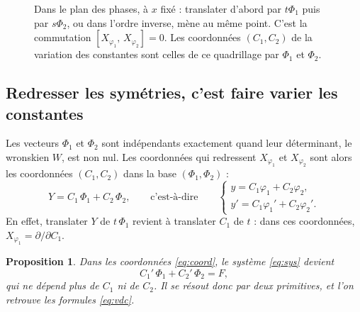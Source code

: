 \documentclass[11pt,a4paper]{article}
\theoremstyle{plain}
\newtheorem{proposition}[theoreme]{Proposition}
\theoremstyle{definition}
\theoremstyle{remark}
\newcommand{\cro}[2]{\left[#1,\,#2\right]}
\begin{document}
\begin{figure}[h]
\centering
{}
\caption{Dans le plan des phases, à $x$ fixé : translater d'abord par $t\Phi_1$ puis par $s\Phi_2$, ou dans l'ordre inverse, mène au même point. C'est la commutation $\cro{X_{\varphi_1}}{X_{\varphi_2}} = 0$. Les coordonnées $(C_1, C_2)$ de la variation des constantes sont celles de ce quadrillage par $\Phi_1$ et $\Phi_2$.}\label{fig:parallelogramme}
\end{figure}

\subsection{Redresser les symétries, c'est faire varier les constantes}

Les vecteurs $\Phi_1$ et $\Phi_2$ sont indépendants exactement quand leur déterminant, le wronskien $W$, est non nul. Les coordonnées qui redressent $X_{\varphi_1}$ et $X_{\varphi_2}$ sont alors les coordonnées $(C_1, C_2)$ dans la base $(\Phi_1, \Phi_2)$ :
\begin{equation}\label{eq:coord}
  Y = C_1\,\Phi_1 + C_2\,\Phi_2,
  \qquad\text{c'est-à-dire}\qquad
  \begin{cases}
    y = C_1\varphi_1 + C_2\varphi_2, \\
    y' = C_1\varphi_1' + C_2\varphi_2'.
  \end{cases}
\end{equation}
En effet, translater $Y$ de $t\,\Phi_1$ revient à translater $C_1$ de $t$ : dans ces coordonnées, $X_{\varphi_1} = \partial/\partial C_1$.

\begin{proposition}
Dans les coordonnées \eqref{eq:coord}, le système \eqref{eq:sys} devient
\[
  C_1'\,\Phi_1 + C_2'\,\Phi_2 = F,
\]
qui ne dépend plus de $C_1$ ni de $C_2$. Il se résout donc par deux primitives, et l'on retrouve les formules \eqref{eq:vdc}.
\end{proposition}
\end{document}
